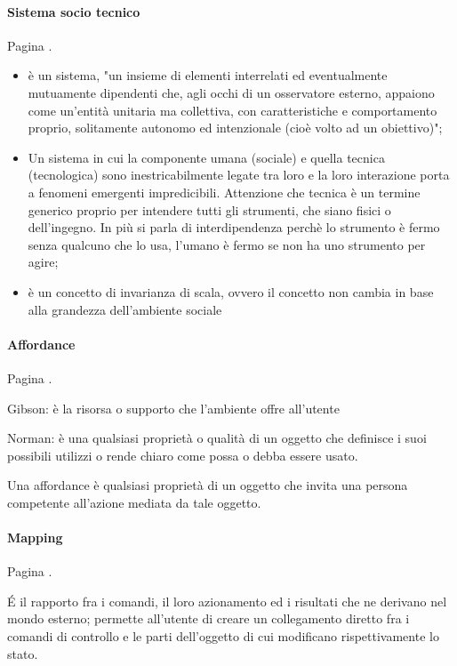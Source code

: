 \documentclass[11pt,a4paper]{book}
\begin{document}
\paragraph{Sistema socio tecnico}
Pagina \pageref{par: sistema sociotecnico}.

\begin{itemize}
	\item è un sistema, "un insieme di elementi interrelati ed eventualmente mutuamente dipendenti che, agli occhi di un osservatore esterno, appaiono come un'entità unitaria ma collettiva, con caratteristiche e comportamento proprio, solitamente autonomo ed intenzionale (cioè volto ad un obiettivo)";
	\item Un sistema in cui la componente umana  (sociale) e quella tecnica (tecnologica) sono inestricabilmente legate tra loro e la loro interazione porta a fenomeni emergenti impredicibili. Attenzione che tecnica è un termine generico proprio per intendere tutti gli strumenti, che siano fisici o dell'ingegno. In più si parla di interdipendenza perchè lo strumento è fermo senza qualcuno che lo usa, l'umano è fermo se non ha uno strumento per agire;
	\item è un concetto di invarianza di scala, ovvero il concetto non cambia in base alla grandezza dell'ambiente sociale
\end{itemize}

\paragraph{Affordance}
Pagina \pageref{par: affordance}.

Gibson: è la risorsa o supporto che l'ambiente offre all'utente

Norman: è una qualsiasi proprietà o qualità di un oggetto che definisce i suoi possibili utilizzi o rende chiaro come possa o debba essere usato.

Una affordance è qualsiasi proprietà di un oggetto che invita una persona competente all'azione mediata da tale oggetto.

\paragraph{Mapping}
Pagina \pageref{par: mapping}.

É il rapporto fra i comandi, il loro azionamento ed i risultati che ne derivano nel mondo esterno; permette all’utente di creare un collegamento diretto fra i comandi di controllo e le parti dell’oggetto di cui modificano rispettivamente lo stato.
\end{document}
